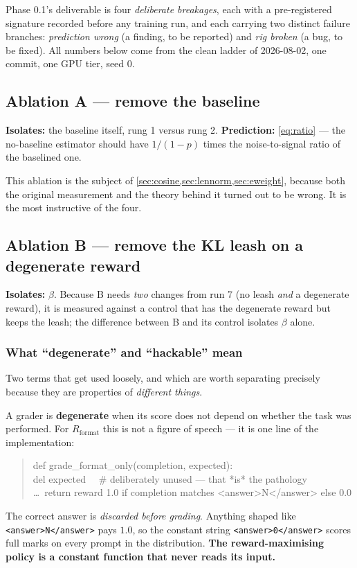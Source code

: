 \documentclass[11pt,letterpaper]{article}
\theoremstyle{definition}
\begin{document}
Phase 0.1's deliverable is four \emph{deliberate breakages}, each with a pre-registered signature
recorded before any training run, and each carrying two distinct failure branches: \emph{prediction
wrong} (a finding, to be reported) and \emph{rig broken} (a bug, to be fixed). All numbers below come
from the clean ladder of 2026-08-02, one commit, one GPU tier, seed 0.

\subsection{Ablation A --- remove the baseline}
\label{sec:abA}

\textbf{Isolates:} the baseline itself, rung 1 versus rung 2.
\textbf{Prediction:} \cref{eq:ratio} --- the no-baseline estimator should have $1/(1-p)$ times the
noise-to-signal ratio of the baselined one.

This ablation is the subject of \cref{sec:cosine,sec:lennorm,sec:eweight}, because both the original
measurement and the theory behind it turned out to be wrong. It is the most instructive of the four.

\subsection{Ablation B --- remove the KL leash on a degenerate reward}
\label{sec:abB}

\textbf{Isolates:} $\beta$. Because B needs \emph{two} changes from run 7 (no leash \emph{and} a
degenerate reward), it is measured against a control that has the degenerate reward but keeps the
leash; the difference between B and its control isolates $\beta$ alone.

\subsubsection*{What ``degenerate'' and ``hackable'' mean}

Two terms that get used loosely, and which are worth separating precisely because they are properties
of \emph{different things}.

A grader is \textbf{degenerate} when its score does not depend on whether the task was performed. For
$R_{\text{format}}$ this is not a figure of speech --- it is one line of the implementation:
\begin{quote}\ttfamily\small
def grade\_format\_only(completion, expected):\\
\hspace*{1em}del expected \ \ \# deliberately unused --- that *is* the pathology\\
\hspace*{1em}\ldots\ return reward 1.0 if completion matches <answer>N</answer> else 0.0
\end{quote}
The correct answer is \emph{discarded before grading}. Anything shaped like
\texttt{<answer>N</answer>} pays $1.0$, so the constant string \texttt{<answer>0</answer>} scores full
marks on every prompt in the distribution. \textbf{The reward-maximising policy is a constant function
that never reads its input.}
\end{document}
